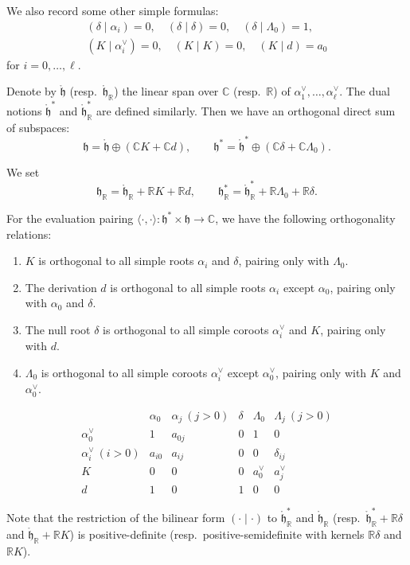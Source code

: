 \documentclass[12pt]{article}
\begin{document}
We also record some other simple formulas:
\begin{align*}
(\delta \mid \alpha_i) = 0, \quad
(\delta \mid \delta) = 0, \quad
(\delta \mid \Lambda_0) = 1, \\
(K \mid \alpha_i^\vee) = 0, \quad
(K \mid K) = 0, \quad 
(K \mid d) = a_0
\end{align*} for $i=0,\dots,\ell$.

Denote by $\mathring{\mathfrak{h}}$ (resp.\ $\mathring{\mathfrak{h}}_{\mathbb{R}}$) the linear span over $\mathbb{C}$ 
(resp.\ $\mathbb{R}$) of $\alpha_1^\vee,\dots,\alpha_\ell^\vee$. 
The dual notions $\mathring{\mathfrak{h}}^{*}$ and $\mathring{\mathfrak{h}}_{\mathbb{R}}^{*}$ are defined similarly. 
Then we have an orthogonal direct sum of subspaces:
\[
\mathfrak{h} = \mathring{\mathfrak{h}} \oplus (\mathbb{C}K + \mathbb{C}d),
\qquad
\mathfrak{h}^* = \mathring{\mathfrak{h}}^* \oplus (\mathbb{C}\delta + \mathbb{C}\Lambda_0).
\]

We set 
\[
\mathfrak{h}_{\mathbb{R}} = \mathring{\mathfrak{h}}_{\mathbb{R}} + \mathbb{R}K + \mathbb{R}d,
\qquad
\mathfrak{h}_{\mathbb{R}}^* = \mathring{\mathfrak{h}}_{\mathbb{R}}^* + \mathbb{R}\Lambda_0 + \mathbb{R}\delta.
\]
\begin{remark} 
    For the evaluation pairing $\langle \cdot, \cdot \rangle : \mathfrak{h}^* \times \mathfrak{h} \to \mathbb{C}$, we have the following orthogonality relations:
    \begin{enumerate}
        \item $K$ is orthogonal to all simple roots $\alpha_i$ and $\delta$, pairing only with $\Lambda_0$. 
        \item The derivation $d$ is orthogonal to all simple roots $\alpha_i$ except $\alpha_0$, pairing only with $\alpha_0$ and $\delta$. 
        \item The null root $\delta$ is orthogonal to all simple coroots $\alpha_i^\vee$ and $K$, pairing only with $d$.
        \item $\Lambda_0$ is orthogonal to all simple coroots $\alpha_i^\vee$ except $\alpha_0^\vee$, pairing only with $K$ and $\alpha_0^\vee$.
    \end{enumerate}
    \[
\begin{array}{c|c|c|c|c|c}
   & \alpha_0 & \alpha_j \ (j>0) & \delta & \Lambda_0 & \Lambda_j \ (j>0) \\ \hline
\alpha_0^\vee & 1 & a_{0j} & 0 & 1 & 0 \\ 
\alpha_i^\vee \ (i>0) & a_{i0} & a_{ij} & 0 & 0 & \delta_{ij} \\
K & 0 & 0 & 0 & a_0^\vee & a_j^\vee \\
d & 1 & 0 & 1 & 0 & 0
\end{array}
\]
\end{remark}
Note that the restriction of the bilinear form $(\cdot \mid \cdot)$ to 
$\mathring{\mathfrak{h}}_{\mathbb{R}}^*$ and $\mathring{\mathfrak{h}}_{\mathbb{R}}$ 
(resp.\ $\mathring{\mathfrak{h}}_{\mathbb{R}}^* + \mathbb{R}\delta$ and 
$\mathring{\mathfrak{h}}_{\mathbb{R}} + \mathbb{R}K$) 
is positive-definite (resp.\ positive-semidefinite with kernels $\mathbb{R}\delta$ and $\mathbb{R}K$).
\end{document}
